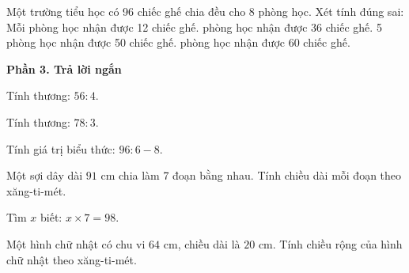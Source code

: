 \begin{ex} %
Một trường tiểu học có 96 chiếc ghế chia đều cho 8 phòng học. Xét tính đúng sai:
\choiceTF
{\True Mỗi phòng học nhận được 12 chiếc ghế.}
{ phòng học nhận được 36 chiếc ghế.}
{5 phòng học nhận được 50 chiếc ghế.}
{ phòng học nhận được 60 chiếc ghế.}
\end{ex}

\textbf{Phần 3. Trả lời ngắn}

\begin{ex} %
Tính thương: $56 : 4$.
\end{ex}

\begin{ex} %
Tính thương: $78 : 3$.
\end{ex}

\begin{ex} %
Tính giá trị biểu thức: $96 : 6 - 8$.
\end{ex}

\begin{ex} %
Một sợi dây dài $91\text{ cm}$ chia làm 7 đoạn bằng nhau. Tính chiều dài mỗi đoạn theo xăng-ti-mét.
\end{ex}

\begin{ex} %
Tìm $x$ biết: $x \times 7 = 98$.
\end{ex}

\begin{ex} %
Một hình chữ nhật có chu vi $64\text{ cm}$, chiều dài là $20\text{ cm}$. Tính chiều rộng của hình chữ nhật theo xăng-ti-mét.
\end{ex}
